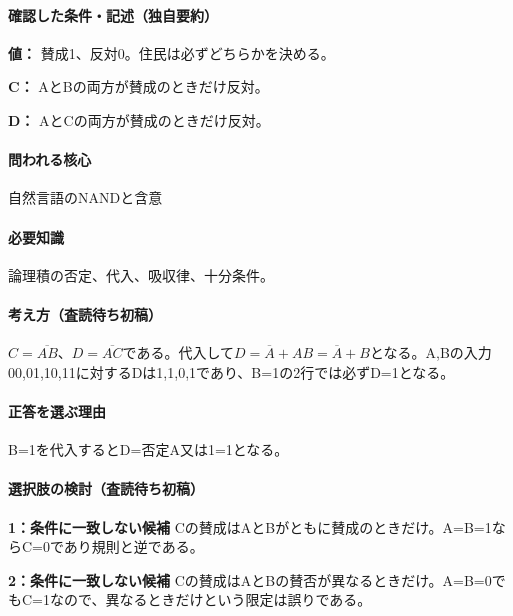 \paragraph{確認した条件・記述（独自要約）}\mbox{}\par

\noindent\textbf{値：} 賛成1、反対0。住民は必ずどちらかを決める。\par

\noindent\textbf{C：} AとBの両方が賛成のときだけ反対。\par

\noindent\textbf{D：} AとCの両方が賛成のときだけ反対。\par

\paragraph{問われる核心} 自然言語のNANDと含意

\paragraph{必要知識} 論理積の否定、代入、吸収律、十分条件。

\paragraph{考え方（査読待ち初稿）} \(C=\overline{AB}\)、\(D=\overline{AC}\)である。代入して\(D=\overline A+AB=\overline A+B\)となる。A,Bの入力00,01,10,11に対するDは1,1,0,1であり、B=\allowbreak{}1の2行では必ずD=\allowbreak{}1となる。

\paragraph{正答を選ぶ理由} B=\allowbreak{}1を代入するとD=否定A又は1=\allowbreak{}1となる。

\paragraph{選択肢の検討（査読待ち初稿）}\mbox{}\par

\noindent\textbf{1：条件に一致しない候補} Cの賛成はAとBがともに賛成のときだけ。A=\allowbreak{}B=\allowbreak{}1ならC=\allowbreak{}0であり規則と逆である。\par

\noindent\textbf{2：条件に一致しない候補} Cの賛成はAとBの賛否が異なるときだけ。A=\allowbreak{}B=\allowbreak{}0でもC=\allowbreak{}1なので、異なるときだけという限定は誤りである。\par

